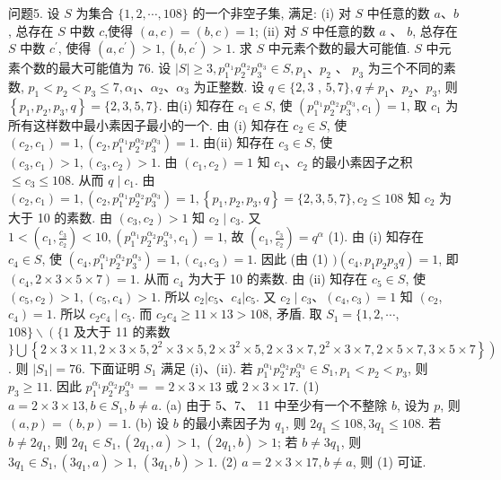 问题5. 设 $S$ 为集合 $\{1,2, \cdots, 108\}$ 的一个非空子集, 满足: (i) 对 $S$ 中任意的数 $a 、 b$, 总存在 $S$ 中数 $c$,使得 $(a, c)=(b, c)=1$; (ii) 对 $S$ 中任意的数 $a$ 、 $b$, 总存在 $S$ 中数 $c^{\prime}$, 使得 $\left(a, c^{\prime}\right)>1,\left(b, c^{\prime}\right)>1$. 求 $S$ 中元素个数的最大可能值.
$S$ 中元素个数的最大可能值为 76. 设 $|S| \geqslant 3, p_1^{\alpha_1} p_2^{\alpha_2} p_3^{\alpha_3} \in S, p_1 、 p_2$ 、 $p_3$ 为三个不同的素数, $p_1<p_2<p_3 \leqslant 7, \alpha_1 、 \alpha_2 、 \alpha_3$ 为正整数.
设 $q \in\{2,3$ , $5,7\}, q \neq p_1 、 p_2 、 p_3$, 则 $\left\{p_1, p_2, p_3, q\right\}=\{2,3,5,7\}$. 由(i) 知存在 $c_1 \in S$, 使 $\left(p_1^{\alpha_1} p_2^{\alpha_2} p_3^{\alpha_3}, c_1\right)=1$, 取 $c_1$ 为所有这样数中最小素因子最小的一个.
由 (i) 知存在 $c_2 \in S$, 使 $\left(c_2, c_1\right)=1,\left(c_2, p_1^{\alpha_1} p_2^{\alpha_2} p_3^{\alpha_3}\right)=1$. 由(ii) 知存在 $c_3 \in S$, 使 $\left(c_3, c_1\right)>1,\left(c_3, c_2\right)>1$. 由 $\left(c_1, c_2\right)=1$ 知 $c_1 、 c_2$ 的最小素因子之积 $\leqslant c_3 \leqslant 108$. 从而 $q \mid c_1$. 由 $\left(c_2, c_1\right)=1,\left(c_2, p_1^{\alpha_1} p_2^{\alpha_2} p_3^{\alpha_3}\right)=1,\left\{p_1, p_2, p_3, q\right\}= \{2,3,5,7\}, c_2 \leqslant 108$ 知 $c_2$ 为大于 10 的素数.
由 $\left(c_3, c_2\right)>1$ 知 $c_2 \mid c_3$. 又 $1<\left(c_1, \frac{c_3}{c_2}\right)<10,\left(p_1^{\alpha_1} p_2^{\alpha_2} p_3^{\alpha_3}, c_1\right)=1$, 故 $\left(c_1, \frac{c_3}{c_2}\right)=q^\alpha$ (1). 由 (i) 知存在 $c_4 \in S$, 使 $\left(c_4, p_1^{\alpha_1} p_2^{\alpha_2} p_3^{\alpha_3}\right)=1,\left(c_4, c_3\right)=1$. 因此 (由 (1) $)\left(c_4, p_1 p_2 p_3 q\right)=1$, 即 $\left(c_4, 2 \times 3 \times 5 \times 7\right)=1$. 从而 $c_4$ 为大于 10 的素数.
由 (ii) 知存在 $c_5 \in S$, 使 $\left(c_5, c_2\right)>1,\left(c_5, c_4\right)>1$. 所以 $c_2\left|c_5 、 c_4\right| c_5$. 又 $c_2 \mid c_3 、\left(c_4, c_3\right)=1$ 知 $\left(c_2\right.$, $\left.c_4\right)=1$. 所以 $c_2 c_4 \mid c_5$. 而 $c_2 c_4 \geqslant 11 \times 13>108$, 矛盾.
取 $S_1=\{1,2, \cdots$, $108\} \backslash\left(\{1\right.$ 及大于 11 的素数 $\} \bigcup\left\{2 \times 3 \times 11,2 \times 3 \times 5,2^2 \times 3 \times 5,2 \times 3^2 \times\right. \left.\left.5,2 \times 3 \times 7,2^2 \times 3 \times 7,2 \times 5 \times 7,3 \times 5 \times 7\right\}\right)$. 则 $\left|S_1\right|=76$. 下面证明 $S_1$ 满足 (i)、(ii). 若 $p_1^{\alpha_1} p_2^{\alpha_2} p_3^{\alpha_3} \in S_1, p_1<p_2<p_3$, 则 $p_3 \geqslant 11$. 因此 $p_1^{\alpha_1} p_2^{\alpha_2} p_3^{\alpha_3}== 2 \times 3 \times 13$ 或 $2 \times 3 \times 17$. (1) $a=2 \times 3 \times 13, b \in S_1, b \neq a$. (a) 由于 5、7、 11 中至少有一个不整除 $b$, 设为 $p$, 则 $(a, p)=(b, p)=1$. (b) 设 $b$ 的最小素因子为 $q_1$, 则 $2 q_1 \leqslant 108,3 q_1 \leqslant 108$. 若 $b \neq 2 q_1$, 则 $2 q_1 \in S_1,\left(2 q_1, a\right)>1$, $\left(2 q_1, b\right)>1$; 若 $b \neq 3 q_1$, 则 $3 q_1 \in S_1,\left(3 q_1, a\right)>1$, $\left(3 q_1, b\right)>1$. (2) $a= 2 \times 3 \times 17, b \neq a$, 则 (1) 可证.
